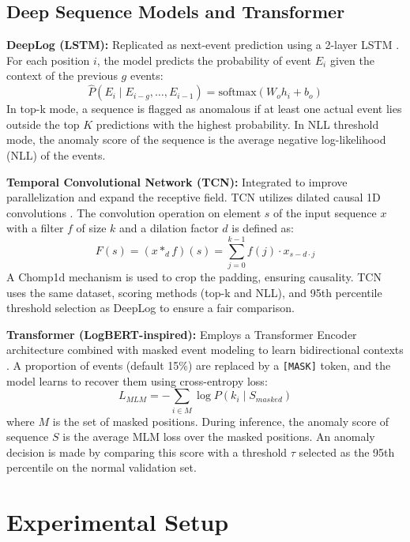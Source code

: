 \documentclass[conference]{IEEEtran}
\begin{document}
\subsection{Deep Sequence Models and Transformer}
\textbf{DeepLog (LSTM):} Replicated as next-event prediction using a 2-layer LSTM \cite{b1}. For each position $i$, the model predicts the probability of event $E_i$ given the context of the previous $g$ events:
\begin{equation}
\hat{P}(E_i \mid E_{i-g}, \ldots, E_{i-1}) = \text{softmax}(W_o h_i + b_o)
\end{equation}
In top-k mode, a sequence is flagged as anomalous if at least one actual event lies outside the top $K$ predictions with the highest probability. In NLL threshold mode, the anomaly score of the sequence is the average negative log-likelihood (NLL) of the events.

\textbf{Temporal Convolutional Network (TCN):} Integrated to improve parallelization and expand the receptive field. TCN utilizes dilated causal 1D convolutions \cite{b19}. The convolution operation on element $s$ of the input sequence $x$ with a filter $f$ of size $k$ and a dilation factor $d$ is defined as:
\begin{equation}
F(s) = (x *_d f)(s) = \sum_{j=0}^{k-1} f(j) \cdot x_{s - d \cdot j}
\end{equation}
A Chomp1d mechanism is used to crop the padding, ensuring causality. TCN uses the same dataset, scoring methods (top-k and NLL), and 95th percentile threshold selection as DeepLog to ensure a fair comparison.

\textbf{Transformer (LogBERT-inspired):} Employs a Transformer Encoder architecture combined with masked event modeling to learn bidirectional contexts \cite{b2}. A proportion of events (default 15\%) are replaced by a \texttt{[MASK]} token, and the model learns to recover them using cross-entropy loss:
\begin{equation}
L_{MLM} = -\sum_{i \in M} \log P(k_i \mid S_{masked})
\label{eq_loss}
\end{equation}
where $M$ is the set of masked positions. During inference, the anomaly score of sequence $S$ is the average MLM loss over the masked positions. An anomaly decision is made by comparing this score with a threshold $\tau$ selected as the 95th percentile on the normal validation set.

\section{Experimental Setup}
\end{document}
